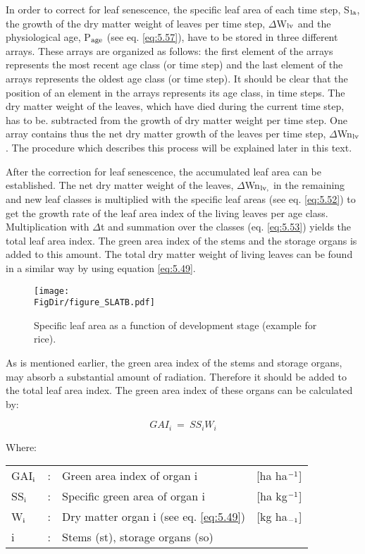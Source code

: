 In order to correct for leaf senescence, the specific leaf area of each time step, S$_{{\rm la}}$, the
growth of the dry matter weight of leaves per time step, $\Delta$W$_{{\rm lv}}$ and the physiological age,
P$_{{\rm age}}$ (see eq. \ref{eq:5.57}), have to be stored in three different arrays. These arrays are organized
as follows: the first element of the arrays represents the most recent age class (or time
step) and the last element of the arrays represents the oldest age class (or time step). It
should be clear that the position of an element in the arrays represents its age class, in
time steps. The dry matter weight of the leaves, which have died during the current time
step, has to be. subtracted from the growth of dry matter weight per time step. One array
contains thus the net dry matter growth of the leaves per time step, $\Delta$Wn$_{{\rm lv}}$. 
The procedure which describes this process will be explained later in this text. 

After the correction for leaf senescence, the accumulated leaf area can be established. The
net dry matter weight of the leaves, $\Delta$Wn$_{{\rm lv,}}$  in the remaining and new leaf classes is
multiplied with the specific leaf areas (see eq. \ref{eq:5.52}) to get the growth rate of the leaf area
index of the living leaves per age class. Multiplication with $\Delta$t and summation over the
classes (eq. \ref{eq:5.53}) yields the total leaf area index. The green area index of the stems and
the storage organs is added to this amount. The total dry matter weight of living leaves
can be found in a similar way by using equation \ref{eq:5.49}.

\begin{figure}[p]
	\centering
	\texttt{[image: \\FigDir/figure\_SLATB.pdf]}
	\caption{Specific leaf area as a function of development stage (example for rice).}
	\label{fig:SpecificLeafArea}
\end{figure}

As is mentioned earlier, the green area index of the stems and storage organs, may absorb
a substantial amount of radiation. Therefore it should be added to the total leaf area
index. The green area index of these organs can be calculated by:

\begin{equation}
GAI_{i} ~=~SS _{i} W _{i} 
\end{equation}

Where:\\[5pt]
\begin{tabularx}{\textwidth}{llXr}
	GAI$_{{\rm i}}$ &:& Green area index of organ i    &
	[ha ha$^{{\rm -1}}$]\\
	SS$_{{\rm i}}$ &:& Specific green area of organ i    &
	[ha kg$^{{\rm -1}}$]\\
	W$_{{\rm i}}$ &:& Dry matter organ i (see eq. \ref{eq:5.49})    &
	[kg ha$_{{\rm -1}}$]\\
	i &:& Stems (st), storage organs (so)\\
\end{tabularx}

